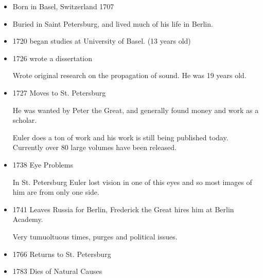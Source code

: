 \documentclass{report}
\begin{document}
\begin{description}
\begin{mdframed}
\begin{itemize}
                \item Born in Basel, Switzerland 1707
                \item Buried in Saint Petersburg, and lived
                    much of his life in Berlin.
                \item 1720 began studies at University of
                    Basel. (13 years old)
                \item 1726 wrote a dissertation
                    \begin{mdframed}
                        Wrote original research on the
                        propagation of sound. He was 19
                        years old.
                    \end{mdframed}
                \item 1727 Moves to St. Petersburg
                    \begin{mdframed}
                        He was wanted by Peter the Great,
                        and generally found money and work as
                        a scholar.
                    \end{mdframed}
                    \begin{mdframed}
                        Euler does a ton of work and his work
                        is still being published today. Currently
                        over 80 large volumes have been released.
                    \end{mdframed}
                \item 1738 Eye Problems
                    \begin{mdframed}
                        In St. Petersburg Euler lost vision
                        in one of this eyes and so most images
                        of him are from only one side.
                    \end{mdframed}
                \item 1741 Leaves Russia for Berlin,
                    Frederick the Great hires him at Berlin
                    Academy.
                    \begin{mdframed}
                        Very tumuoltuous times, purges and
                        political issues.
                    \end{mdframed}
                \item 1766 Returns to St. Petersburg
                \item 1783 Dies of Natural Causes
                    \begin{mdframed}

\end{mdframed}
\end{itemize}
\end{mdframed}
\end{description}
\end{document}
